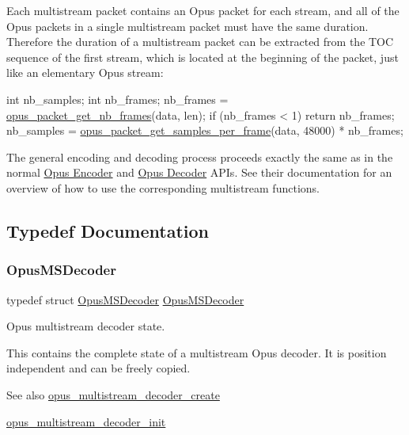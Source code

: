 Each multistream packet contains an Opus packet for each stream, and all of the Opus packets in a single multistream packet must have the same duration. Therefore the duration of a multistream packet can be extracted from the T\+OC sequence of the first stream, which is located at the beginning of the packet, just like an elementary Opus stream\+:


\begin{DoxyCode}
\textcolor{keywordtype}{int} nb\_samples;
\textcolor{keywordtype}{int} nb\_frames;
nb\_frames = \hyperlink{group__opus__decoder_ga064cb2ed9e77a934cd7db6c13b02c584}{opus\_packet\_get\_nb\_frames}(data, len);
\textcolor{keywordflow}{if} (nb\_frames < 1)
  \textcolor{keywordflow}{return} nb\_frames;
nb\_samples = \hyperlink{group__opus__decoder_gab2a955acced631c6cb7876bbdc7953d4}{opus\_packet\_get\_samples\_per\_frame}(data, 48000) * nb\_frames;
\end{DoxyCode}


The general encoding and decoding process proceeds exactly the same as in the normal \hyperlink{group__opus__encoder}{Opus Encoder} and \hyperlink{group__opus__decoder}{Opus Decoder} A\+P\+Is. See their documentation for an overview of how to use the corresponding multistream functions. 

\subsection{Typedef Documentation}
\mbox{\label{group__opus__multistream_gad3497495deb9a8ace82e76cd4f93e0e4}} 
\subsubsection{\texorpdfstring{Opus\+M\+S\+Decoder}{OpusMSDecoder}}
{\footnotesize\ttfamily typedef struct \hyperlink{group__opus__multistream_gad3497495deb9a8ace82e76cd4f93e0e4}{Opus\+M\+S\+Decoder} \hyperlink{group__opus__multistream_gad3497495deb9a8ace82e76cd4f93e0e4}{Opus\+M\+S\+Decoder}}



Opus multistream decoder state. 

This contains the complete state of a multistream Opus decoder. It is position independent and can be freely copied. \begin{DoxySeeAlso}{See also}
\hyperlink{group__opus__multistream_ga3c0e342774174c471e61cedba53755c9}{opus\+\_\+multistream\+\_\+decoder\+\_\+create} 

\hyperlink{group__opus__multistream_ga09a4d14fc497d4f6fbe76bd1c5d45436}{opus\+\_\+multistream\+\_\+decoder\+\_\+init} 
\end{DoxySeeAlso}
\mbox{\label{group__opus__multistream_gae5826674d142fc873ebc1d781c507dd7}} 
